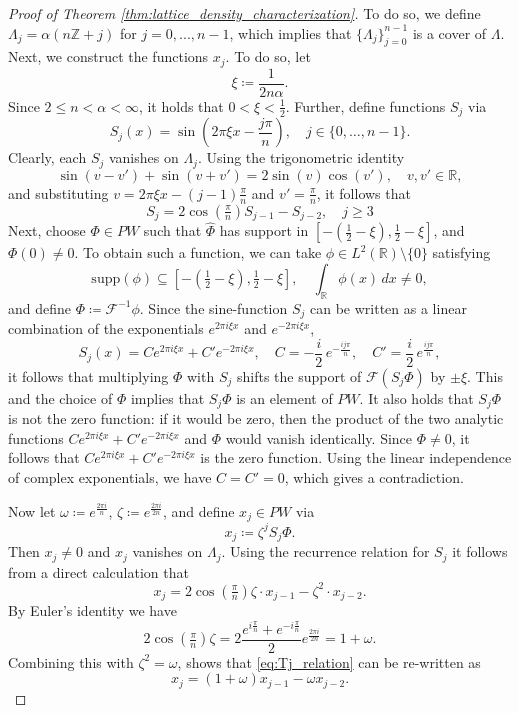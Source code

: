 \documentclass[reqno,a4paper,11pt]{amsart}
\numberwithin{equation}{section}
\def\Z{{\mathbb Z}}
\def\R{{\mathbb R}}
\newcommand{\supp}{{\mathrm{supp}}}
\newcommand\1{\mathds{1}}
\newcommand{\ift}{{\mathcal{F}^{-1}}}
\begin{document}
\begin{proof}[Proof of Theorem \ref{thm:lattice_density_characterization}]
    To do so, we define $\Lambda_j = \alpha(n\Z+j)$ for $j=0,...,n-1$, which implies that $\{ \Lambda_j \}_{j=0}^{n-1}$ is a cover of $\Lambda$. Next, we construct the functions $x_j$. To do so, let
    $$
    \xi \coloneqq \frac{1}{2n\alpha}.
    $$
    Since $2\leq n<\alpha < \infty$, it holds that $0 < \xi < \frac{1}{2}$. Further, define functions $S_j$ via
    $$
    S_j(x) = \sin \left ( 2\pi \xi x - \frac{j\pi}{n} \right ), \quad j \in \{ 0, \dots, n-1 \}.
    $$
    Clearly, each $S_j$ vanishes on $\Lambda_j$. Using the trigonometric identity
    $$
    \sin(v-v') + \sin(v+v') = 2 \sin(v)\cos(v'), \quad v,v' \in \R,
    $$
    and substituting $v = 2\pi \xi x  - (j-1)\frac{\pi}{n}$ and $v' = \frac{\pi}{n}$, it follows that
    $$
    S_j = 2 \cos(\tfrac{\pi}{n}) S_{j-1} - S_{j-2}, \quad j \geq 3
    $$
    Next, choose $\Phi \in PW$ such that $\hat \Phi$ has support in $[-(\frac{1}{2}-\xi),\frac{1}{2}-\xi]$, and $\Phi(0) \neq 0$. To obtain such a function, we can take $\phi \in L^2(\R) \setminus \{0 \}$ satisfying
    $$
    \supp(\phi) \subseteq [-(\tfrac{1}{2}-\xi),\tfrac{1}{2}-\xi], \quad \int_\R \phi(x) \, dx \neq 0,
    $$
    and define $\Phi \coloneqq \ift \phi$.
    Since the sine-function $S_j$ can be written as a linear combination of the exponentials $e^{2\pi i \xi x}$ and $e^{-2\pi i \xi x}$,
    $$
    S_j(x) = C e^{2\pi i \xi x} + C'e^{-2\pi i \xi x}, \quad C=-\frac{i}{2}\, e^{ -\frac{i j \pi}{n}}, \quad C' = \frac{i}{2}\, e^{\frac{i j \pi}{n}},
    $$
    it follows that multiplying $\Phi$ with $S_j$ shifts the support of $\mathcal{F}(S_j \Phi)$ by $\pm \xi$. This and the choice of $\Phi$ implies that $S_j \Phi$ is an element of $PW$. It also holds that $S_j \Phi$ is not the zero function: if it would be zero, then the product of the two analytic functions $C e^{2\pi i \xi x} + C'e^{-2\pi i \xi x}$ and $\Phi$ would vanish identically. Since $\Phi \neq 0$, it follows that $C e^{2\pi i \xi x} + C'e^{-2\pi i \xi x}$ is the zero function. Using the linear independence of complex exponentials, we have $C=C'=0$, which gives a contradiction.
    
Now let $\omega \coloneqq e^{\frac{2\pi i }{n}}$, $\zeta \coloneqq e^{\frac{2\pi i }{2n}}$, and define $x_j \in PW$ via
    $$
    x_j \coloneqq \zeta^j S_j \Phi.
    $$
    Then $x_j \neq 0$ and $x_j$ vanishes on $\Lambda_j$.
    Using the recurrence relation for $S_j$ it follows from a direct calculation that
    \begin{equation}\label{eq:Tj_relation}
        x_j = 2 \cos(\tfrac{\pi}{n}) \zeta \cdot  x_{j-1} - \zeta^2 \cdot  x_{j-2}.
    \end{equation}
    By Euler's identity we have
    $$
    2 \cos(\tfrac{\pi}{n}) \zeta = 2 \frac{e^{i\frac{\pi}{n}} + e^{-i\frac{\pi}{n}}}{2} e^{\frac{2\pi i }{2n}} = 1+\omega.
    $$
    Combining this with $\zeta^2 = \omega$, shows that \eqref{eq:Tj_relation} can be re-written as
    $$
    x_j = (1+\omega) x_{j-1} - \omega x_{j-2}.
    $$
\end{proof}
\end{document}
